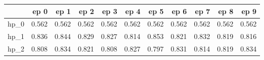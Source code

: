 \begin{tabular}{lrrrrrrrrrr}
\toprule
{} &   ep 0 &   ep 1 &   ep 2 &   ep 3 &   ep 4 &   ep 5 &   ep 6 &   ep 7 &   ep 8 &   ep 9 \\
\midrule
hp\_0 &  0.562 &  0.562 &  0.562 &  0.562 &  0.562 &  0.562 &  0.562 &  0.562 &  0.562 &  0.562 \\
hp\_1 &  0.836 &  0.844 &  0.829 &  0.827 &  0.814 &  0.853 &  0.821 &  0.832 &  0.819 &  0.816 \\
hp\_2 &  0.808 &  0.834 &  0.821 &  0.808 &  0.827 &  0.797 &  0.831 &  0.814 &  0.819 &  0.834 \\
\bottomrule
\end{tabular}
